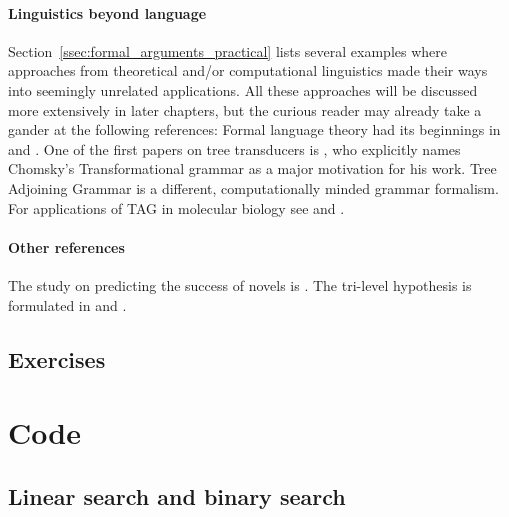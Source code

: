 \begin{literature}
\paragraph{Linguistics beyond language}
Section~\ref{ssec:formal_arguments_practical} lists several examples where approaches from theoretical and\slash or computational linguistics made their ways into seemingly unrelated applications.
All these approaches will be discussed more extensively in later chapters, but the curious reader may already take a gander at the following references:
Formal language theory had its beginnings in \citet{Chomsky57,Chomsky59} and \citet{ChomskySchuetzenberger63}.
One of the first papers on tree transducers is \citet{Rounds70}, who explicitly names Chomsky's Transformational grammar as a major motivation for his work.
Tree Adjoining Grammar \citep{Joshi85} is a different, computationally minded grammar formalism.
For applications of TAG in molecular biology see \citet{Uemura.etal99} and \citet{Matsui.etal05}.

\paragraph{Other references}
The study on predicting the success of novels is \citet{AshokEtAl13}.
The tri-level hypothesis is formulated in \citet{MarrPoggio76} and \citet{Marr82}.
\end{literature}

\subsection*{Exercises}
\label{sec:formal_exercises}










\section{Code}
\label{sec:formal_code}

\subsection{Linear search and binary search}
\label{ssec:formal_code_search}

